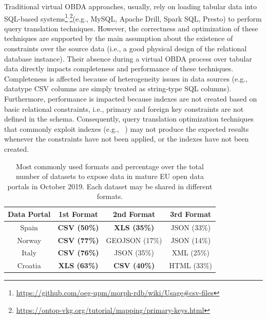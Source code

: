 Traditional virtual OBDA approaches, usually, rely on loading tabular data into SQL-based systems\footnote{\url{https://github.com/oeg-upm/morph-rdb/wiki/Usage\#csv-files}}$^,$\footnote{\url{https://ontop-vkg.org/tutorial/mapping/primary-keys.html}}(e.g., MySQL, Apache Drill, Spark SQL, Presto) to perform query translation techniques. However, the correctness and optimization of these techniques are supported by the main assumption about the existence of constraints over the source data (i.e., a good physical design of the relational database instance). Their absence during a virtual OBDA process over tabular data directly impacts  completeness and performance of these techniques. Completeness is affected because of heterogeneity issues in data sources (e.g., datatype CSV columns are simply treated as string-type SQL columns). Furthermore, performance is impacted because indexes are not created based on basic relational constraints, i.e., primary and foreign key constraints are not defined in the schema. Consequently, query translation optimization techniques that commonly exploit indexes (e.g., ~\citep{rodriguez2015efficient,priyatna2014formalisation}) may not produce the expected results whenever the constraints have not been applied, or the indexes have not been created.
\begin{table}[t]
\centering
\caption{Most commonly used formats and percentage over the total number of datasets to expose data in mature EU open data portals in October 2019. Each dataset may be shared in different formats.}
\label{tab:odp}
\begin{tabular}{c|c|c|c}
\hline
\rowcolor{orange!20} 
\textbf{Data Portal} & \textbf{1st Format}  & \textbf{2nd Format} & \textbf{3rd Format} \\ \hline
Spain                & \textbf{CSV (50\%)}  & \textbf{XLS (35\%)}  & JSON (33\%)          \\ 
Norway               & \textbf{CSV (77\%)}    & GEOJSON (17\%)         & JSON (14\%)            \\ 
Italy               & \textbf{CSV (76\%)}  & JSON (35\%)          & XML (25\%)           \\ 
Croatia              & \textbf{XLS (63\%)}    & \textbf{CSV (40\%)}   & HTML (33\%)           \\ \hline
\end{tabular}
\end{table}

